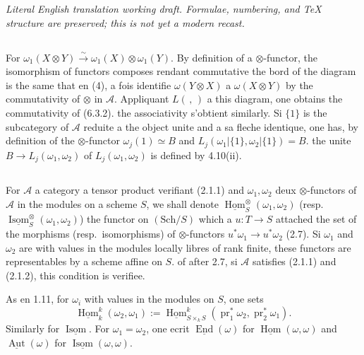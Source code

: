\documentclass[12pt,a4paper]{article}
\theoremstyle{plain}
\theoremstyle{definition}
\DeclareMathOperator{\Hom}{Hom}
\DeclareMathOperator{\End}{End}
\DeclareMathOperator{\Aut}{Aut}
\DeclareMathOperator{\Isom}{Isom}
\DeclareMathOperator{\pr}{pr}
\begin{document}
\begin{center}\small\emph{Literal English translation working draft. Formulae, numbering, and TeX structure are preserved; this is not yet a modern recast.}\end{center}
\vspace{0.5em}

\nonstopmode
\setcounter{section}{5}
\setcounter{theorem}{4}

\subsection{}

For $\omega_1(X \otimes Y) \xrightarrow{\sim} \omega_1(X) \otimes \omega_1(Y)$. By definition of a $\otimes$-functor, the isomorphism of functors composes rendant commutative the bord of the diagram is the same that en (4), a fois identifie $\omega(Y \otimes X)$ a $\omega(X \otimes Y)$ by the commutativity of $\otimes$ in $\mathcal{A}$. Appliquant $L(\, , \,)$ a this diagram, one obtains the commutativity of (6.3.2). the associativity s'obtient similarly. Si $\{1\}$ is the subcategory of $\mathcal{A}$ reduite a the object unite and a sa fleche identique, one has, by definition of the $\otimes$-functor $\omega_j(1) \simeq B$ and $L_j(\omega_1|\{1\}, \omega_2|\{1\}) = B$. the unite $B \to L_j(\omega_1, \omega_2)$ of $L_j(\omega_1, \omega_2)$ is defined by 4.10(ii).

\subsection{}

For $\mathcal{A}$ a category a tensor product verifiant (2.1.1) and $\omega_1, \omega_2$ deux $\otimes$-functors of $\mathcal{A}$ in the modules on a scheme $S$, we shall denote $\underline{\Hom}^\otimes_S(\omega_1, \omega_2)$ (resp.~$\underline{\Isom}^\otimes_S(\omega_1, \omega_2)$) the functor on $(\mathrm{Sch}/S)$ which a $u : T \to S$ attached the set of the morphisms (resp.~isomorphisms) of $\otimes$-functors $u^*\omega_1 \to u^*\omega_2$ (2.7). Si $\omega_1$ and $\omega_2$ are with values in the modules locally libres of rank finite, these functors are representables by a scheme affine on $S$. of after 2.7, si $\mathcal{A}$ satisfies (2.1.1) and (2.1.2), this condition is verifiee.

As en 1.11, for $\omega_i$ with values in the modules on $S$, one sets
\[
\underline{\Hom}^k_k(\omega_2, \omega_1) := \underline{\Hom}^k_{S \times_k S}(\pr_1^*\omega_2, \pr_2^*\omega_1).
\]
Similarly for $\underline{\Isom}$. For $\omega_1 = \omega_2$, one ecrit $\underline{\End}(\omega)$ for $\underline{\Hom}(\omega, \omega)$ and $\underline{\Aut}(\omega)$ for $\underline{\Isom}(\omega, \omega)$.
\end{document}
